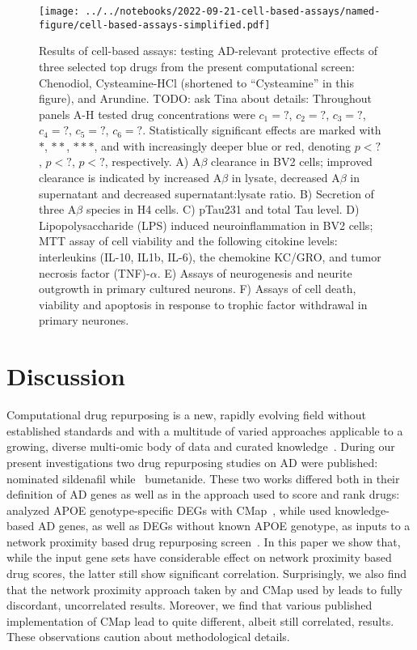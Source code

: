 \documentclass[letterpaper]{article}
\begin{document}
\begin{figure}
\texttt{[image: ../../notebooks/2022-09-21-cell-based-assays/named-figure/cell-based-assays-simplified.pdf]}
\caption{Results of cell-based assays: testing AD-relevant protective effects of three
  selected top drugs from the present computational screen: Chenodiol,
  Cysteamine-HCl (shortened to ``Cysteamine'' in this figure), and Arundine.
  TODO: ask Tina about details: Throughout panels A-H tested drug
  concentrations were $c_1 = ?$, $c_2 = ?$, $c_3 = ?$, $c_4 = ?$, $c_5 = ?$,
  $c_6 = ?$.  Statistically significant effects are marked with $\ast$,
  $\ast\ast$, $\ast\ast\ast$, and with increasingly deeper blue or red,
  denoting $p < ?$, $p < ?$,  $p < ?$, respectively.
  A) A$\beta$ clearance in BV2 cells; improved clearance is indicated by
  increased A$\beta$ in lysate, decreased A$\beta$ in supernatant and
  decreased supernatant:lysate ratio.
  B) Secretion of three A$\beta$ species in H4 cells.
  C) pTau231 and total Tau level.
  D) Lipopolysaccharide (LPS) induced neuroinflammation in BV2 cells; MTT
  assay of cell viability and the following citokine levels: interleukins
  (IL-10, IL1b, IL-6), the chemokine KC/GRO, and tumor necrosis factor
  (TNF)-$\alpha$.
  E) Assays of neurogenesis and neurite outgrowth in primary cultured neurons.
  F) Assays of cell death, viability and apoptosis in response to trophic
  factor withdrawal in primary neurones.
}
\label{fig:cell-based-assays}
\end{figure}


\section{Discussion}

Computational drug repurposing is a new, rapidly evolving field without
established standards and with a multitude of varied approaches applicable to
a growing, diverse multi-omic body of data and curated
knowledge~\citep{Pushpakom2019}.  During our present investigations two drug
repurposing studies on AD were published: \cite{Fang2021} nominated sildenafil
while~\cite{Taubes2021} bumetanide.  These two works differed both in their
definition of AD genes as well as in the approach used to score and rank
drugs: \cite{Taubes2021} analyzed APOE genotype-specific DEGs with
CMap~\citep{Lamb2006}, while \cite{Fang2021} used knowledge-based AD genes, as
well as DEGs without known APOE genotype, as inputs to a network proximity
based drug repurposing screen~\citep{Cheng2018}.  In this paper we show that,
while the input gene sets have considerable effect on network proximity based
drug scores, the latter still show significant correlation.  Surprisingly, we
also find that the network proximity approach taken by \cite{Fang2021} and
CMap used by \cite{Taubes2021} leads to fully discordant, uncorrelated
results.  Moreover, we find that various published implementation of CMap lead
to quite different, albeit still correlated, results.  These observations
caution about methodological details.
\end{document}
